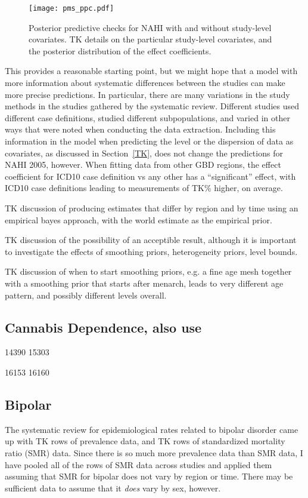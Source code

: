 \begin{figure}
\begin{center}
\texttt{[image: pms\_ppc.pdf]}
\end{center}
\caption{Posterior predictive checks for NAHI with and without
  study-level covariates. TK details on the particular study-level covariates, and the posterior distribution of the effect coefficients.}
\label{pms_ppc}
\end{figure}

This provides a reasonable starting point, but we might hope that a
model with more information about systematic differences between the
studies can make more precise predictions.  In particular, there are
many variations in the study methods in the studies gathered by the
systematic review.  Different studies used different case definitions,
studied different subpopulations, and varied in other ways that were
noted when conducting the data extraction.  Including this information
in the model when predicting the level or the dispersion of data as
covariates, as discussed in Section~\ref{TK}, does not change the
predictions for NAHI 2005, however.  When fitting data from other GBD
regions, the effect coefficient for ICD10 case definition vs any other
has a ``significant'' effect, with ICD10 case definitions leading to
measurements of TK\% higher, on average.

TK discussion of producing estimates that differ by region and  by time
using an empirical bayes approach, with the world estimate as the
empirical prior.

TK discussion of the possibility of an acceptible result, although it
is important to investigate the effects of smoothing priors,
heterogeneity priors, level bounds.

TK discussion of when to start smoothing priors, e.g. a fine age mesh
together with a smoothing prior that starts after menarch, leads to
very different age pattern, and possibly different levels overall.


\subsection{Cannabis Dependence, also use}
14390 15303 

16153 16160 

\subsection{Bipolar}
The systematic review for epidemiological rates related to bipolar
disorder came up with TK rows of prevalence data, and TK rows of
standardized mortality ratio (SMR) data.  Since there is so much more
prevalence data than SMR data, I have pooled all of the rows of SMR
data across studies and applied them assuming that SMR for bipolar
does not vary by region or time.  There may be sufficient data to assume
that it \emph{does} vary by sex, however. 

